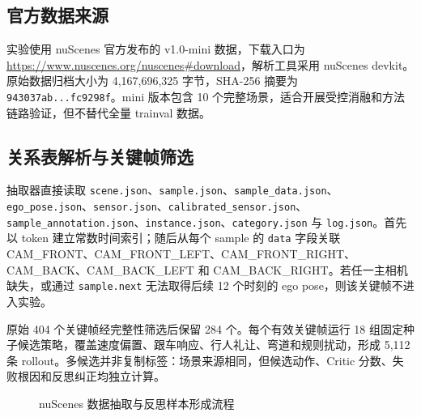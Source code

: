 \documentclass[UTF8,a4paper,12pt,fontset=fandol]{ctexart}
\begin{document}
\subsection{官方数据来源}
实验使用 nuScenes 官方发布的 v1.0-mini 数据，下载入口为 \url{https://www.nuscenes.org/nuscenes\#download}，解析工具采用 nuScenes devkit。原始数据归档大小为 4,167,696,325 字节，SHA-256 摘要为 \texttt{943037ab...fc9298f}。mini 版本包含 10 个完整场景，适合开展受控消融和方法链路验证，但不替代全量 trainval 数据。

\subsection{关系表解析与关键帧筛选}
抽取器直接读取 \texttt{scene.json}、\texttt{sample.json}、\texttt{sample\_data.json}、\texttt{ego\_pose.json}、\texttt{sensor.json}、\texttt{calibrated\_sensor.json}、\texttt{sample\_annotation.json}、\texttt{instance.json}、\texttt{category.json} 与 \texttt{log.json}。首先以 token 建立常数时间索引；随后从每个 sample 的 \texttt{data} 字段关联 CAM\_FRONT、CAM\_FRONT\_LEFT、CAM\_FRONT\_RIGHT、CAM\_BACK、CAM\_BACK\_LEFT 和 CAM\_BACK\_RIGHT。若任一主相机缺失，或通过 \texttt{sample.next} 无法取得后续 12 个时刻的 ego pose，则该关键帧不进入实验。

原始 404 个关键帧经完整性筛选后保留 284 个。每个有效关键帧运行 18 组固定种子候选策略，覆盖速度偏置、跟车响应、行人礼让、弯道和规则扰动，形成 5,112 条 rollout。多候选并非复制标签：场景来源相同，但候选动作、Critic 分数、失败根因和反思纠正均独立计算。

\begin{figure}[!htbp]
\centering
{}
\caption{nuScenes 数据抽取与反思样本形成流程}
\end{figure}
\end{document}
